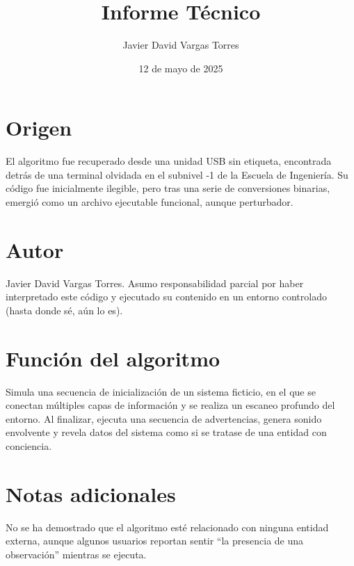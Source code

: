 \title{Informe Técnico}
\author{Javier David Vargas Torres}
\date{12 de mayo de 2025}



\maketitle

\section*{Origen}

El algoritmo fue recuperado desde una unidad USB sin etiqueta, encontrada detrás de una terminal olvidada en el subnivel -1 de la Escuela de Ingeniería. Su código fue inicialmente ilegible, pero tras una serie de conversiones binarias, emergió como un archivo ejecutable funcional, aunque perturbador.

\section*{Autor}

Javier David Vargas Torres. Asumo responsabilidad parcial por haber interpretado este código y ejecutado su contenido en un entorno controlado (hasta donde sé, aún lo es).

\section*{Función del algoritmo}

Simula una secuencia de inicialización de un sistema ficticio, en el que se conectan múltiples capas de información y se realiza un escaneo profundo del entorno. Al finalizar, ejecuta una secuencia de advertencias, genera sonido envolvente y revela datos del sistema como si se tratase de una entidad con conciencia.

\section*{Notas adicionales}

No se ha demostrado que el algoritmo esté relacionado con ninguna entidad externa, aunque algunos usuarios reportan sentir “la presencia de una observación” mientras se ejecuta.


